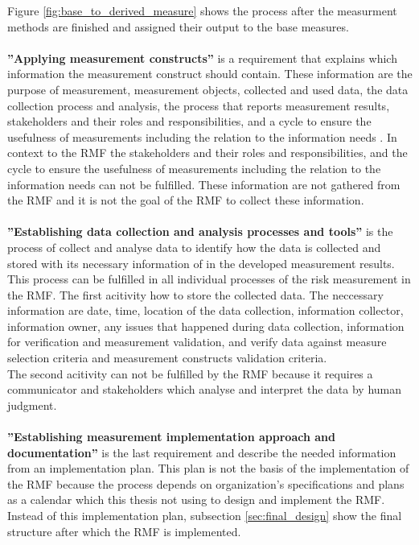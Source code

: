 Figure \ref{fig:base_to_derived_measure} shows the process after the measurment methods are finished and assigned their output to the base measures.\\ \\

\textbf{''Applying measurement constructs''} is a requirement that explains which information the measurement construct should contain. These information are the purpose of measurement, measurement objects, collected and used data, the data collection process and analysis, the process that reports measurement results, stakeholders and their roles and responsibilities, and a cycle to ensure the usefulness of measurements including the relation to the information needs \cite{ISO_27004_2009}. In context to the RMF the stakeholders and their roles and responsibilities, and the cycle to ensure the usefulness of measurements including the relation to the information needs can not be fulfilled. These information are not gathered from the RMF and it is not the goal of the RMF to collect these information. \\ \\

\textbf{''Establishing data collection and analysis processes and tools''} is the process of collect and analyse data to identify how the data is collected and stored with its necessary information of in the developed measurement results. This process can be fulfilled in all individual processes of the risk measurement in the RMF. The first acitivity how to store the collected data. The neccessary information are date, time, location of the data collection, information collector, information owner, any issues that happened during data collection, information for verification and measurement validation, and verify data against measure selection criteria and measurement constructs validation criteria. \\ The second acitivity can not be fulfilled by the RMF because it requires a communicator and stakeholders which analyse and interpret the data by human judgment. \\ \\

\textbf{''Establishing measurement implementation approach and documentation''} is the last requirement and describe the needed information from an implementation plan. This plan is not the basis of the implementation of the RMF because the process depends on organization's specifications and plans as a calendar which this thesis not using to design and implement the RMF. Instead of this implementation plan, subsection \ref{sec:final_design} show the final structure after which the RMF is implemented. \\ \\

